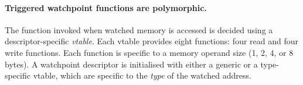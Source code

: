 \documentclass[letterpaper,twocolumn,10pt]{article}
\begin{document}



\paragraph{Triggered watchpoint functions are polymorphic.} The function invoked when watched memory is accessed is decided using a descriptor-specific \emph{vtable}. Each vtable provides eight functions: four read and four write functions. Each function is specific to a memory operand size (1, 2, 4, or 8 bytes). A watchpoint descriptor is initialised with either a generic or a type-specific vtable, which are specific to the \emph{type} of the watched address. %


\end{document}
